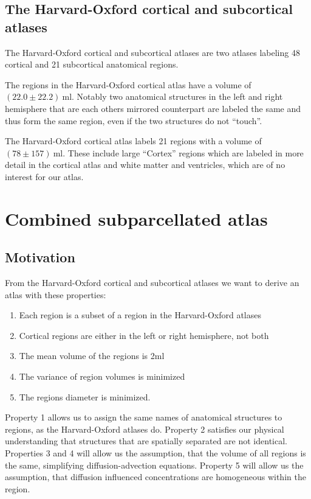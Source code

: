 \documentclass[12pt, a4paper]{article}
\begin{document}
\subsection{The Harvard-Oxford cortical and subcortical atlases}
The Harvard-Oxford cortical and subcortical atlases are two atlases labeling 48 cortical and 21 subcortical anatomical regions.

The regions in the Harvard-Oxford cortical atlas have a volume of $ ( 22.0  \pm 22.2 )  ~\text{ml}$.
Notably two anatomical structures in the left and right hemisphere that are each others mirrored counterpart are labeled the same and thus form the same region, even if the two structures do not ``touch''.

The Harvard-Oxford cortical atlas labels 21 regions with a volume of $ ( 78  \pm 157 )  ~\text{ml}$. These include large ``Cortex'' regions which are labeled in more detail in the cortical atlas and white matter and ventricles, which are of no interest for our atlas.

\section{Combined subparcellated atlas}
\subsection{Motivation}
From the Harvard-Oxford cortical and subcortical atlases we want to derive an atlas with these properties:
\begin{enumerate}
 \item Each region is a subset of a region in the Harvard-Oxford atlases
 \item Cortical regions are either in the left or right hemisphere, not both
 \item The mean volume of the regions is 2ml
 \item The variance of region volumes is minimized
 \item The regions diameter is minimized.
\end{enumerate}

Property 1 allows us to assign the same names of anatomical structures to regions, as the Harvard-Oxford atlases do. 
Property 2 satisfies our physical understanding that structures that are spatially separated are not identical.
Properties 3 and 4 will allow us the assumption, that the volume of all regions is the same, simplifying diffusion-advection equations.
Property 5 will allow us the assumption, that diffusion influenced concentrations are homogeneous within the region.
\end{document}
